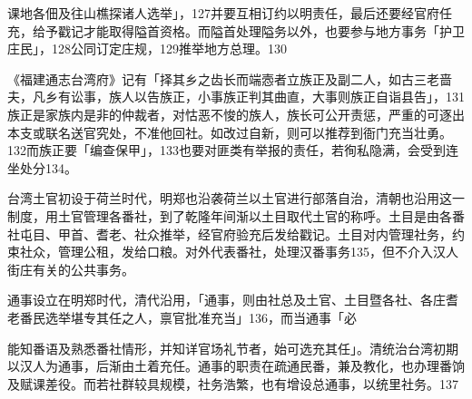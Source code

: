 \noindent 课地各佃及往山樵探诸人选举」，127并要互相订约以明责任，最后还要经官府任充，给予戳记才能取得隘首资格。而隘首处理隘务以外，也要参与地方事务「护卫庄民」，128公同订定庄规，129推举地方总理。130


\noindent 《福建通志台湾府》记有「择其乡之齿长而端悫者立族正及副二人，如古三老啬夫，凡乡有讼事，族人以告族正，小事族正判其曲直，大事则族正自诣县告」，131族正是家族内是非的仲裁者，对怙恶不悛的族人，族长可公开责惩，严重的可逐出本支或联名送官究处，不准他回社。如改过自新，则可以推荐到衙门充当壮勇。132而族正要「编查保甲」，133也要对匪类有举报的责任，若徇私隐满，会受到连坐处分134。


\noindent 台湾土官初设于荷兰时代，明郑也沿袭荷兰以土官进行部落自治，清朝也沿用这一制度，用土官管理各番社，到了乾隆年间渐以土目取代土官的称呼。土目是由各番社屯目、甲首、耆老、社众推举，经官府验充后发给戳记。土目对内管理社务，约束社众，管理公租，发给口粮。对外代表番社，处理汉番事务135，但不介入汉人街庄有关的公共事务。


\noindent 通事设立在明郑时代，清代沿用，「通事，则由社总及土官、土目暨各社、各庄耆老番民选举堪专其任之人，禀官批准充当」136，而当通事「必

\vfill
\begin{BookNotes}
\end{BookNotes}

\noindent 能知番语及熟悉番社情形，并知详官场礼节者，始可选充其任」。清统治台湾初期以汉人为通事，后渐由土着充任。通事的职责在疏通民番，兼及教化，也办理番饷及赋课差役。而若社群较具规模，社务浩繁，也有增设总通事，以统里社务。137


